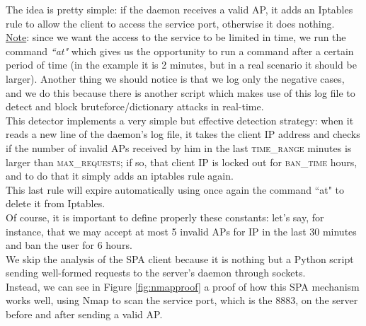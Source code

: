\documentclass[12pt]{report}
\begin{document}
{{\begin{python}
\end{python}
\bigskip

The idea is pretty simple: if the daemon receives a valid AP, it adds an Iptables rule to allow the client to access the service port, otherwise it does nothing.\\
\underline{Note}: since we want the access to the service to be limited in time, we run the command \emph{``at"} which gives us the opportunity to run a command after a certain period of time (in the example it is 2 minutes, but in a real scenario it should be larger). Another thing we should notice is that we log only the negative cases, and we do this because there is another script which makes use of this log file to detect and block bruteforce/dictionary attacks in real-time.\\

This detector implements a very simple but effective detection strategy: when it reads a new line of the daemon's log file, it takes the client IP address and checks if the number of invalid APs received by him in the last \textsc{time\_range} minutes is larger than \textsc{max\_requests}; if so, that client IP is locked out for \textsc{ban\_time} hours, and to do that it simply adds an iptables rule again.\\
This last rule will expire automatically using once again the command ``at" to delete it from Iptables.\\
Of course, it is important to define properly these constants: let's say, for instance, that we may accept at most 5 invalid APs for IP in the last 30 minutes and ban the user for 6 hours.\\

We skip the analysis of the SPA client because it is nothing but a Python script sending well-formed requests to the server's daemon through sockets.\\

Instead, we can see in Figure \ref{fig:nmapproof} a proof of how this SPA mechanism works well, using Nmap to scan the service port, which is the 8883, on the server before and after sending a valid AP.

}}
\end{document}
